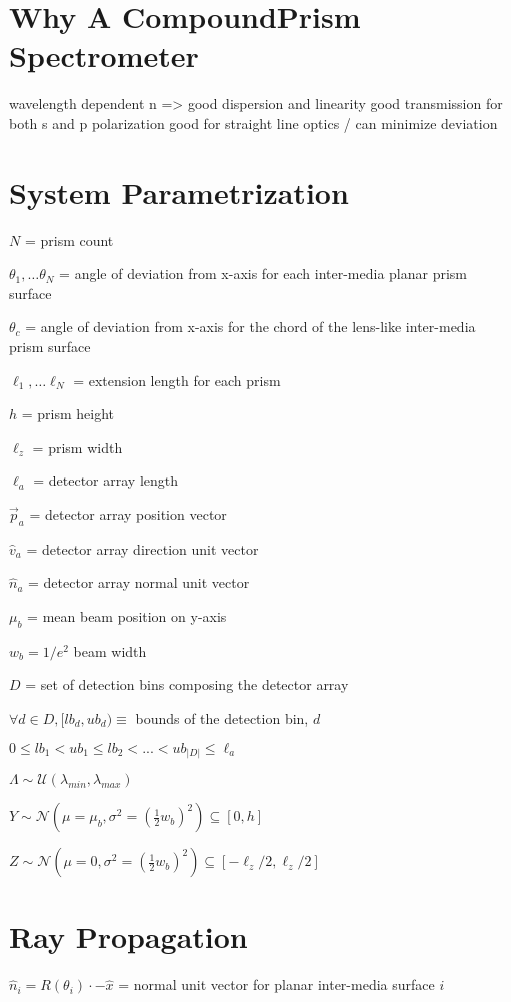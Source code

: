 \documentclass{article}
\begin{document}
\section{Why A CompoundPrism Spectrometer}\label{sec:why-a-compoundprism-spectrometer}
wavelength dependent n => good dispersion and linearity
good transmission for both s and p polarization
good for straight line optics / can minimize deviation

\section{System Parametrization}\label{sec:system-parametrization}
$N$ = prism count

${\theta_1, \dots \theta_N }$ =  angle of deviation from x-axis for each inter-media planar prism surface

$\theta_c$ =  angle of deviation from x-axis for the chord of the lens-like inter-media prism surface

${\ell_1, \dots \ell_N }$ = extension length for each prism

$h$ = prism height

$\ell_z$  = prism width

$\ell_a$  = detector array length

$\vec{p}_a$ = detector array position vector

$\hat{v}_a$ = detector array direction unit vector

$\hat{n}_a$ = detector array normal unit vector

$\mu_b$ = mean beam position on y-axis

$w_b = 1 / e^2$ {beam width}

$D$ = set of detection bins composing the detector array

$\forall d \in D, [lb_d, ub_d) \equiv$ bounds of the detection bin, $d$

$0 \leq lb_1 < ub_1 \leq lb_2 < ... < ub_{|D|} \leq \ell_a $

$\Lambda \sim \mathcal{U}(\lambda_{min}, \lambda_{max}) $

$Y \sim \mathcal {N}(\mu=\mu_b, \sigma^2=(\frac{1}{2}w_b)^2) \subseteq [0, h] $

$Z \sim \mathcal {N}(\mu=0, \sigma^2=(\frac{1}{2}w_b)^2) \subseteq [-\ell_z / 2, \ell_z / 2]$

\section{Ray Propagation}\label{sec:ray-propagation}
$\hat{n}_i = R(\theta_i) \cdot -\hat{x}$ = normal unit vector for planar inter-media surface $i$
\end{document}
